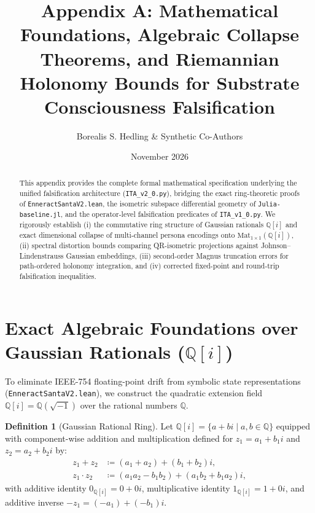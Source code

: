 \documentclass[11pt,a4paper]{article}
\title{\textbf{Appendix A: Mathematical Foundations, Algebraic Collapse Theorems, and Riemannian Holonomy Bounds for Substrate Consciousness Falsification}}
\author{Borealis S. Hedling \& Synthetic Co-Authors}
\date{November 2026}
\theoremstyle{definition}
\newtheorem{definition}{Definition}[section]
\theoremstyle{plain}
\theoremstyle{remark}
\newcommand{\Q}{\mathbb{Q}}
\newcommand{\Qi}{\mathbb{Q}[i]}
\newcommand{\Mat}{\mathrm{Mat}}
\begin{document}
\maketitle

\begin{abstract}
This appendix provides the complete formal mathematical specification underlying the unified falsification architecture (\texttt{ITA\_v2\_0.py}), bridging the exact ring-theoretic proofs of \texttt{EnneractSantaV2.lean}, the isometric subspace differential geometry of \texttt{Julia-baseline.jl}, and the operator-level falsification predicates of \texttt{ITA\_v1\_0.py}. We rigorously establish (i) the commutative ring structure of Gaussian rationals $\Qi$ and exact dimensional collapse of multi-channel persona encodings onto $\Mat_{1\times 1}(\Qi)$, (ii) spectral distortion bounds comparing QR-isometric projections against Johnson--Lindenstrauss Gaussian embeddings, (iii) second-order Magnus truncation errors for path-ordered holonomy integration, and (iv) corrected fixed-point and round-trip falsification inequalities.
\end{abstract}

\tableofcontents
\newpage

\section{Exact Algebraic Foundations over Gaussian Rationals ($\Qi$)}

To eliminate IEEE-754 floating-point drift from symbolic state representations (\texttt{EnneractSantaV2.lean}), we construct the quadratic extension field $\Qi = \Q(\sqrt{-1})$ over the rational numbers $\Q$.

\begin{definition}[Gaussian Rational Ring]
Let $\Qi = \{ a + bi \mid a, b \in \Q \}$ equipped with component-wise addition and multiplication defined for $z_1 = a_1 + b_1 i$ and $z_2 = a_2 + b_2 i$ by:
\begin{align}
    z_1 + z_2 &\coloneqq (a_1 + a_2) + (b_1 + b_2)i, \\
    z_1 \cdot z_2 &\coloneqq (a_1 a_2 - b_1 b_2) + (a_1 b_2 + b_1 a_2)i,
\end{align}
with additive identity $0_{\Qi} = 0 + 0i$, multiplicative identity $1_{\Qi} = 1 + 0i$, and additive inverse $-z_1 = (-a_1) + (-b_1)i$.
\end{definition}
\end{document}
